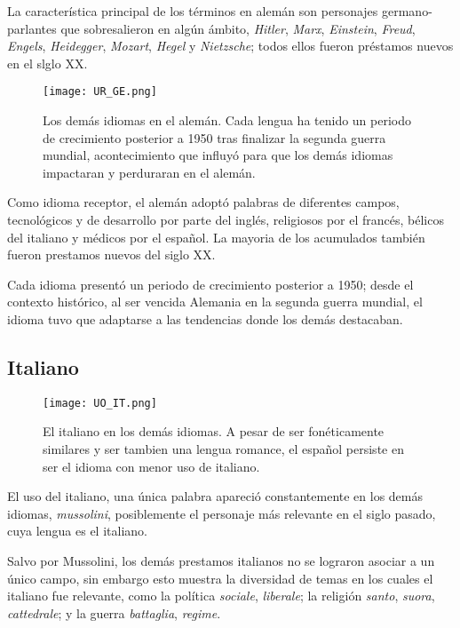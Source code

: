 La característica principal de los términos en alemán son personajes germano-parlantes que sobresalieron en algún ámbito, \textit{Hitler}, \textit{Marx}, \textit{Einstein}, \textit{Freud}, \textit{Engels}, \textit{Heidegger}, \textit{Mozart}, \textit{Hegel} y \textit{Nietzsche}; todos ellos fueron préstamos nuevos en el slglo XX. 


\begin{figure}%
	\centering
	\texttt{[image: UR\_GE.png]}
	\label{fig.ST_b_GE}
	\caption{Los demás idiomas en el alemán. Cada lengua ha tenido un periodo de crecimiento posterior a 1950 tras finalizar la segunda guerra mundial, acontecimiento que influyó para que los demás idiomas impactaran y perduraran en el alemán.}
\end{figure}

Como idioma receptor, el alemán adoptó palabras de diferentes campos, tecnológicos y de desarrollo por parte del inglés,  religiosos  por el francés, bélicos del italiano y médicos por el español. La mayoria de los acumulados también fueron prestamos nuevos del siglo XX. 

Cada idioma presentó un periodo de crecimiento posterior a 1950; desde el contexto histórico, al ser vencida Alemania en la segunda guerra mundial, el idioma tuvo que adaptarse a las tendencias donde los demás destacaban. 





\subsection{Italiano} %

\begin{figure}%
	\centering
	\texttt{[image: UO\_IT.png]}
	\label{fig.ST_a_IT}
	\caption{El italiano en los demás idiomas. A pesar de ser fonéticamente similares y ser tambien una lengua romance,  el español persiste en ser el idioma con menor uso de italiano.}
\end{figure}
		
		
El uso del italiano, una única palabra apareció constantemente en los demás idiomas, \textit{mussolini}, posiblemente el personaje más relevante en el siglo pasado, cuya lengua es el italiano.  

Salvo por Mussolini, los demás prestamos italianos no se lograron asociar a un único campo, sin embargo esto muestra la diversidad de temas en los cuales el italiano fue relevante, como la política \textit{sociale}, \textit{liberale}; la religión \textit{santo}, \textit{suora}, \textit{cattedrale}; y la guerra \textit{battaglia}, \textit{regime}.


